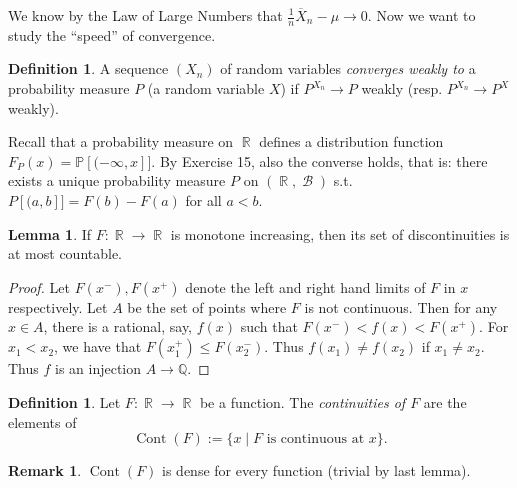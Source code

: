 \documentclass[12pt,a4paper]{report}
\theoremstyle{definition}
\newtheorem{lemma}[theorem]{Lemma}
\newtheorem{definition}[theorem]{Definition}
\newtheorem*{remark}{Remark}
\theoremstyle{num.custom-title}
\DeclareMathOperator{\B}{\mathcal{B}}
\DeclareMathOperator{\R}{\mathbb{R}}
\DeclareMathOperator{\Cont}{Cont}
\newcommand{\ol}{\overline}
\newcommand{\Q}{\mathbb{Q}}
\renewcommand{\1}{\mathbbm{1}}
\renewcommand{\P}{\mathbb{P}}
\begin{document}
We know by the Law of Large Numbers that $\frac{1}{n} \ol{X}_n - \mu \to 0$. Now we want to study the ``speed'' of convergence.

\begin{definition}
A sequence $(X_n)$ of random variables \emph{converges weakly to} a probability measure $P$ (a random variable $X$) if $P^{X_n} \to P$ weakly (resp. $P^{X_n} \to P^X$ weakly).
\end{definition}

Recall that a probability measure on $\R$ defines a distribution function $F_P(x) = \P[(-\infty,x]]$. By Exercise 15, also the converse holds, that is: there exists a unique probability measure $P$ on $(\R,\B)$ s.t. $P[(a,b]] = F(b)-F(a)$ for all $a<b$.

\begin{lemma}
If $F: \R \to \R$ is monotone increasing, then its set of discontinuities is at most countable.
\begin{proof}
Let $F(x^-),F(x^+)$ denote the left and right hand limits of $F$ in $x$ respectively. Let $A$ be the set of points where $F$ is not continuous. Then for any $x \in A$, there is a rational, say, $f(x)$ such that $F(x^-) < f(x) < F(x^+)$. For $x_1 < x_2$, we have that $F(x_1^+) \leq F(x_2^-)$. Thus $f(x_1) \neq f(x_2)$ if $x_1 \neq x_2$. Thus $f$ is an injection $A \to \Q$.
\end{proof}
\end{lemma}

\begin{definition}
Let $F \colon \R \to \R$ be a function. The \emph{continuities of $F$} are the elements of
\[
\Cont(F) := \{x \mid F \text{ is continuous at } x\}.
\]
\end{definition}

\begin{remark}
$\Cont(F)$ is dense for every function (trivial by last lemma).
\end{remark}
\end{document}
